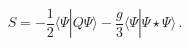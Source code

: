\begin{equation}
S = -\frac{1}{2}\langle \Psi | Q  \Psi \rangle
-\frac{g}{3}  \langle \Psi | \Psi \star \Psi \rangle\,.
\end{equation}

